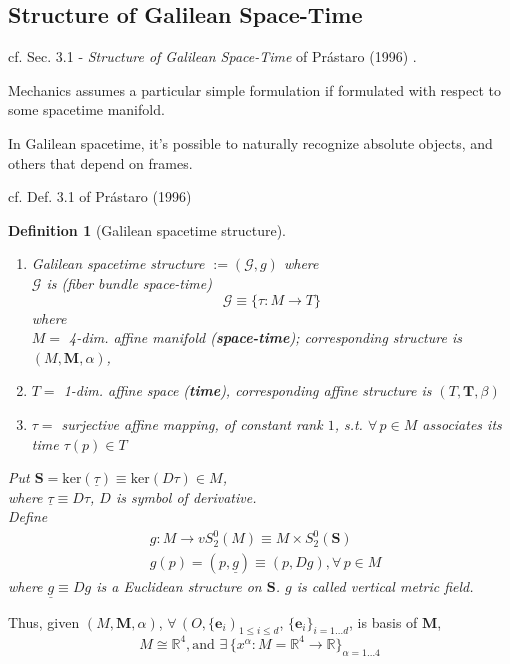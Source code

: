 \documentclass[10pt]{amsart}
\newtheorem{definition}{Definition}
\begin{document}
\begin{multicols*}{2}
\subsection{Structure of Galilean Space-Time}

cf. Sec. 3.1 - \emph{Structure of Galilean Space-Time} of Pr\'{a}staro (1996) \cite{Pras1996}.

Mechanics assumes a particular simple formulation if formulated with respect to some spacetime manifold.

In Galilean spacetime, it's possible to naturally recognize absolute objects, and others that depend on frames.

cf. Def. 3.1 of Pr\'{a}staro (1996) \cite{Pras1996}
\begin{definition}[Galilean spacetime structure]
\begin{enumerate}
	\item Galilean spacetime structure $:= (\mathcal{G}, g)$ where \\
	$\mathcal{G}$ is (fiber bundle space-time)
	\begin{equation}
		\mathcal{G} \equiv \lbrace \tau : M \to T \rbrace
	\end{equation}
	where \\
	$M = $ 4-dim. affine manifold (\textbf{space-time}); corresponding structure is $(M, \mathbf{M}, \alpha)$, \\
\item	$T = $ 1-dim. affine space (\textbf{time}), corresponding affine structure is $(T, \mathbf{T}, \beta)$
\item $\tau = $ surjective affine mapping, of constant rank $1$, s.t. $\forall \, p \in M$ associates its time $\tau(p) \in T$
\end{enumerate}

Put $\mathbf{S} = \text{ker}(\underline{\tau}) \equiv \text{ker}(D\tau)\in M$, \\
	where $\underline{\tau} \equiv D\tau$, $D$ is symbol of derivative.\\	
	Define 
	\[
	\begin{aligned}
	& g: M \to vS_2^0(M) \equiv M \times S_2^0(\mathbf{S}) \\ 
	& g(p) = (p, \underline{g})  \equiv (p, Dg) , \forall \, p \in M
	\end{aligned}
	\]
	where $\underline{g} \equiv Dg$ is a Euclidean structure on $\mathbf{S}$.  $g$ is called vertical metric field.
\end{definition}

Thus, given $(M, \mathbf{M}, \alpha)$, $\forall \, (O, \lbrace \mathbf{e}_i)_{1 \leq i \leq d}$, $\lbrace \mathbf{e}_i \rbrace_{i=1\dots d}$, is basis of $\mathbf{M}$, 
\[
M \cong \mathbb{R}^4, \text{and } \exists \, \lbrace x^{\alpha} : M = \mathbb{R}^4 \to \mathbb{R} \rbrace_{\alpha = 1 \dots 4}
\]


\end{multicols*}
\end{document}
